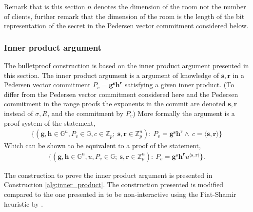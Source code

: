 Remark that is this section $n$ denotes the dimension of the room not the number of clients, further remark that the dimension of the room is the length of the bit representation of the secret in the Pedersen vector commitment considered below. 

\subsubsection*{Inner product argument}
\label{sec:inner_prod}
The bulletproof construction is based on the inner product argument presented in this section. The inner product argument is a argument of knowledge of $\textbf{s},\mathbf{r}$ in a  Pedersen vector commitment $P_v=\mathbf{g}^\mathbf{s}\mathbf{h}^\mathbf{r}$ satisfying a given inner product. (To differ from the Pedersen vector commitment considered here and the Pedersen commitment in the range proofs the exponents in the commit are denoted $\mathbf{s},\mathbf{r}$ instead of $\sigma,R$, and the commitment by $P_v$) More formally the argument is a proof system of the statement,
\begin{align*}
    \{(\mathbf{g},\mathbf{h}\in\mathds{G}^n,P_v\in\mathds{G},c\in\mathds{Z}_p;\: \mathbf{s},\mathbf{r}\in\mathds{Z}_p^n) : \: P_v=\mathbf{g}^\mathbf{s}\mathbf{h}^\mathbf{r}\wedge\: c =\langle\mathbf{s},\mathbf{r}\rangle\}
\end{align*}
Which can be shown to be equivalent to a proof of the statement,
\begin{align*}
    \{(\mathbf{g},\mathbf{h}\in\mathds{G}^n,u,P_v\in\mathds{G};\: \mathbf{s},\mathbf{r}\in\mathds{Z}_p^n) : \: P_v=\mathbf{g}^\mathbf{s}\mathbf{h}^\mathbf{r}u^{\langle\mathbf{s},\mathbf{r}\rangle}\}.
\end{align*}

The construction to prove the inner product argument is presented in Construction \ref{alg:inner_product}. The construction presented is modified compared to the one presented in \cite{bulletProofs_theory} to be non-interactive using the Fiat-Shamir heuristic by \cite{ZKRP_Morais}.

